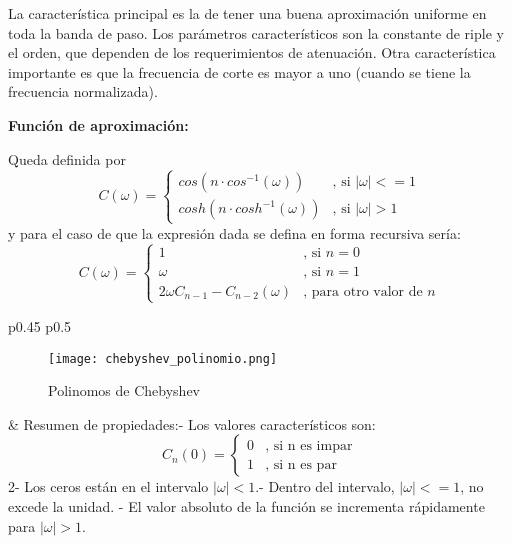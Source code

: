 \documentclass[informe.tex]{subfiles}
\begin{document}
La característica principal es la de tener una buena aproximación uniforme en toda la banda de paso. Los parámetros característicos son la constante de riple y el orden, que dependen de los requerimientos de atenuación. Otra característica importante es que la frecuencia de corte es mayor a uno (cuando se tiene la frecuencia normalizada). \newline

\textbf{Función de aproximación:}\newline

Queda definida por
		\[	
		C(\omega ) 	=
		    \begin{cases}
		    		cos(n \cdot cos^{-1}( \omega) )  &
		                          \mbox{, si  } \left| \omega \right| <=1   \\
		    		cosh(n \cdot cosh^{-1}( \omega) )  &
		                          \mbox{, si } \left| \omega \right| >1   
		    \end{cases}
		\]
y para el caso de que la expresión dada se defina en forma recursiva sería:	
		$$
		C(\omega)=
		    \begin{cases}
			    1                                & \mbox{, si } n=0\\
 	      		\omega                           & \mbox{, si } n=1\\
    				2\omega C_{n-1}- C_{n-2}(\omega) & \mbox{, para otro valor de } n
		    \end{cases}
		$$\newline
		   	    		
 \begin{tabular}{p{0.45\textwidth} p{0.5\textwidth}}		
			
			\begin{wrapfigure}{l}{0.9\linewidth}
			\centering
			\texttt{[image: chebyshev\_polinomio.png]}
			\caption{Polinomos de Chebyshev}
			\end{wrapfigure}				
			&
			Resumen de propiedades:- Los valores característicos son:
				\[  
					C_n(0)= \begin{cases}
							    0  & \mbox{, si n es impar} \\
 	      						1  & \mbox{, si n es par} 
						    \end{cases}
				 \]
			2- Los ceros están en el intervalo $ \left| \omega \right|<1$.- Dentro del intervalo, $ \left| \omega \right|<=1$, no excede la unidad. - El valor absoluto de la función se incrementa rápidamente para $|\omega|>1$.
		\end{tabular} 
\\\\\\\\\\\\\\\\\\
\end{document}
